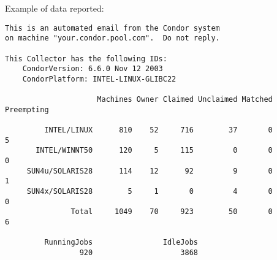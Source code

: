 Example of data reported:

\begin{verbatim}
This is an automated email from the Condor system
on machine "your.condor.pool.com".  Do not reply.

This Collector has the following IDs:
    CondorVersion: 6.6.0 Nov 12 2003
    CondorPlatform: INTEL-LINUX-GLIBC22

                     Machines Owner Claimed Unclaimed Matched Preempting

         INTEL/LINUX      810    52     716        37       0          5
       INTEL/WINNT50      120     5     115         0       0          0
     SUN4u/SOLARIS28      114    12      92         9       0          1
     SUN4x/SOLARIS28        5     1       0         4       0          0
               Total     1049    70     923        50       0          6

         RunningJobs                IdleJobs
                 920                    3868
\end{verbatim}



